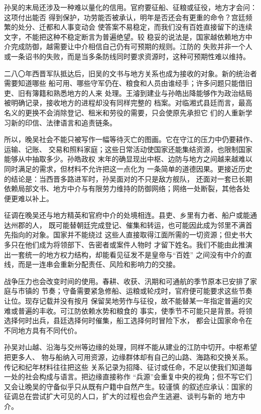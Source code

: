 孙吴的末局还涉及一种难以量化的信用。官府要征船、征粮或征役，地方才会问：这项付出能否
得到保护，功劳能否被承认，明年是否还会有更重的命令？宫廷频繁的处分、迁都和人事变动会
使答案不易稳定，而我们没有百姓直接留下的连续文字，不能把这种不稳定断言为普遍绝望。较
稳妥的说法是，国家越依赖地方中介完成防御，越需要让中介相信自己仍有可预期的规则。江防的
失败并非一个人或一条诏书的失败，而是当多条防线同时要求资源时，这种可预期性难以维持。

二八〇年西晋军队抵达后，旧吴的文书与地方关系也成为接收的对象。新的统治者需要知道哪些
船可用、哪些守军仍在、粮食和人员由谁经手；许多问题只能借旧吏、旧有簿籍和熟悉地方的人来
处理。王濬到建业与孙皓出降能够作为政治结局被明确记录，接收地方的进程却没有同样完整的
档案。对临湘式县廷而言，最高名义的更换不会消除登记、租米和劳役的需要，只会使原先承担它
们的人重新学习新的印信、法律语言和追责链条。

所以，晚吴社会不能只被写作一幅等待灭亡的图画。它在守江的压力中仍要耕作、运输、记账、
交易和照料家庭；这些日常活动使国家还能集结资源，也限制国家能够从中抽取多少。孙皓政权
末年的确显现出中枢、边防与地方之间越来越难以同时满足的需求，但材料不允许把这一点化为
一条简单的道德因果。更接近历史的结论是：当西晋多路进军时，孙吴面对的不只是敌方舰队，
还面对一套已长期依赖局部文书、地方中介与有限劳力维持的防御网络；网络一处断裂，其他各处
便更难以补上。

征调在晚吴还与地方精英和官府中介的处境相连。县吏、乡里有力者、船户或能通达州郡的人，
既可能替朝廷完成登记、催集和转运，也可能因此成为邻里不满首先指向的对象。国家并不能绕过
这些人直接取得江面所需的一切资源；但史书大多只在他们成为将领部下、告密者或案件人物时
才留下姓名。我们不能由此推演出一套统一的地方权力结构，却能看见征发不是皇帝与“百姓”
之间没有中介的直线，而是一连串会重新分配责任、风险和影响力的交接。

战争压力也会改变时间的使用。春耕、收获、汛期和可通航的季节原本已安排了家庭与市镇的
节奏；守备需要紧急修船、运粮或轮戍时，官府便可能要求这些节奏让位。现存记载并没有按月
保留吴地劳作与征役，故不能替某一年指定普遍的灾难或普遍的丰收。可江防依赖水势和粮食的
事实，使季节不可能只是背景。将领选择何时出兵，县廷选择何时催集，船工选择何时冒险下水，
都会让国家命令在不同地方具有不同代价。

孙吴对山越、沿海与交州等边缘的处理，同样不能从建业的江防中切开。中枢希望把更多人、
物与船纳入可用资源，边缘群体却有自己的山路、海路和交换关系。传记和纪年材料往往把这些
关系记录为招降、征讨或任命，不足以使我们知道每一处的社会构成与语言。把边缘直接称作
“兵源”会重复中央的视角；但不写它们又会让晚吴的守备似乎只从既有户籍中自然产生。较谨慎
的叙述应承认：国家的征调总在尝试扩大可见的人口，扩大的过程也会产生逃避、谈判与新的
地方中介。

